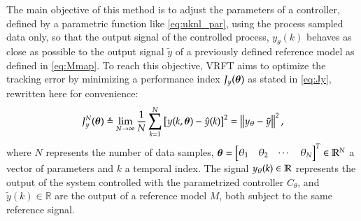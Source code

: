 The main objective of this method is to adjust the parameters of a controller, defined by a parametric function like \eqref{eq:uknl_par}, using the process sampled data only, so that the output signal of the controlled process, $y_\theta(k)$ behaves as close as possible to the output signal $\tilde{y}$ of a previously defined reference model as defined in \eqref{eq:Mmap}.
To reach this objective, VRFT aims to optimize the tracking error by minimizing a performance index $J_y(\bm{\theta})$ as stated in \eqref{eq:Jy}, rewritten here for convenience:
\begin{equation}
   J^N_y(\bm{\theta}) \triangleq \lim_{N \to \infty}  \frac{1}{N} \sum_{k=1}^N \left[y(k,\bm{\theta}) - \hat{y}(k)\right]^2 = 
    \left\lVert y_\theta - \tilde{y} \right\lVert^{2}
   \label{eq:Jy},
\end{equation}
where $N$ represents the number of data samples, $\bm{\theta} = \begin{bmatrix} \theta_1 & \theta_2 & \cdots & \theta_N \end{bmatrix}^T \in \mathbb{R}^N$ a vector of parameters and $k$ a temporal index. The signal $y_\theta(k) \in \mathbb{R} $ represents the output of the  system controlled with the parametrized controller $C_\theta$, and $\tilde{y}(k) \in \mathbb{R}$ are the output of a reference model $M$, both subject to the same reference signal.

